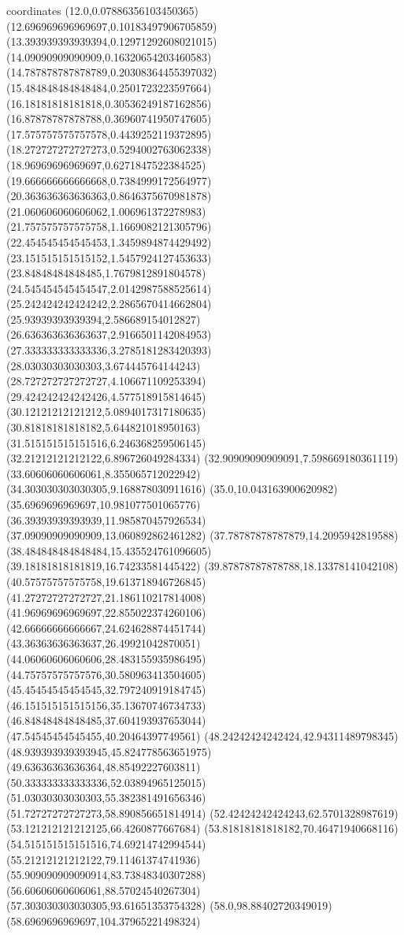 coordinates {%
(12.0,0.07886356103450365)
(12.696969696969697,0.10183497906705859)
(13.393939393939394,0.12971292608021015)
(14.09090909090909,0.16320654203460583)
(14.787878787878789,0.20308364455397032)
(15.484848484848484,0.2501723223597664)
(16.18181818181818,0.30536249187162856)
(16.87878787878788,0.36960741950747605)
(17.575757575757578,0.4439252119372895)
(18.272727272727273,0.5294002763062338)
(18.96969696969697,0.6271847522384525)
(19.666666666666668,0.7384999172564977)
(20.363636363636363,0.8646375670981878)
(21.060606060606062,1.006961372278983)
(21.757575757575758,1.1669082121305796)
(22.454545454545453,1.3459894874429492)
(23.151515151515152,1.5457924127453633)
(23.84848484848485,1.7679812891804578)
(24.545454545454547,2.0142987588525614)
(25.242424242424242,2.2865670414662804)
(25.93939393939394,2.586689154012827)
(26.636363636363637,2.9166501142084953)
(27.333333333333336,3.2785181283420393)
(28.03030303030303,3.674445764144243)
(28.727272727272727,4.106671109253394)
(29.424242424242426,4.577518915814645)
(30.12121212121212,5.0894017317180635)
(30.81818181818182,5.644821018950163)
(31.515151515151516,6.246368259506145)
(32.21212121212122,6.896726049284334)
(32.90909090909091,7.598669180361119)
(33.60606060606061,8.355065712022942)
(34.303030303030305,9.168878030911616)
(35.0,10.043163900620982)
(35.6969696969697,10.981077501065776)
(36.39393939393939,11.985870457926534)
(37.09090909090909,13.060892862461282)
(37.78787878787879,14.2095942819588)
(38.484848484848484,15.435524761096605)
(39.18181818181819,16.74233581445422)
(39.87878787878788,18.13378141042108)
(40.57575757575758,19.613718946726845)
(41.27272727272727,21.186110217814008)
(41.96969696969697,22.855022374260106)
(42.66666666666667,24.624628874451744)
(43.36363636363637,26.49921042870051)
(44.06060606060606,28.483155935986495)
(44.75757575757576,30.580963413504605)
(45.45454545454545,32.797240919184745)
(46.151515151515156,35.13670746734733)
(46.84848484848485,37.604193937653044)
(47.54545454545455,40.20464397749561)
(48.24242424242424,42.94311489798345)
(48.939393939393945,45.824778563651975)
(49.63636363636364,48.85492227603811)
(50.333333333333336,52.03894965125015)
(51.03030303030303,55.382381491656346)
(51.72727272727273,58.890856651814914)
(52.42424242424243,62.5701328987619)
(53.121212121212125,66.4260877667684)
(53.81818181818182,70.46471940668116)
(54.515151515151516,74.69214742994544)
(55.21212121212122,79.11461374741936)
(55.909090909090914,83.73848340307288)
(56.60606060606061,88.57024540267304)
(57.303030303030305,93.61651353754328)
(58.0,98.88402720349019)
(58.6969696969697,104.37965221498324)
}

